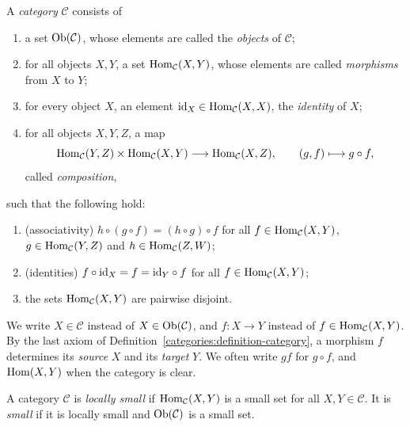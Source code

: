 \begin{definition}\label{categories:definition-category}
A \emph{category} $\mathcal{C}$ consists of
\begin{enumerate}
\item a set $\operatorname{Ob}(\mathcal{C})$, whose elements are called the \emph{objects} of
$\mathcal{C}$;
\item for all objects $X, Y$, a set $\operatorname{Hom}_{\mathcal{C}}(X, Y)$, whose elements
are called \emph{morphisms} from $X$ to $Y$;
\item for every object $X$, an element $\mathrm{id}_X \in \operatorname{Hom}_{\mathcal{C}}(X, X)$,
the \emph{identity} of $X$;
\item for all objects $X, Y, Z$, a map
\[
\operatorname{Hom}_{\mathcal{C}}(Y, Z) \times \operatorname{Hom}_{\mathcal{C}}(X, Y) \longrightarrow
\operatorname{Hom}_{\mathcal{C}}(X, Z), \qquad (g, f) \longmapsto g \circ f,
\]
called \emph{composition},
\end{enumerate}
such that the following hold:
\begin{enumerate}
\item (associativity) $h \circ (g \circ f) = (h \circ g) \circ f$ for all
$f \in \operatorname{Hom}_{\mathcal{C}}(X, Y)$, $g \in \operatorname{Hom}_{\mathcal{C}}(Y, Z)$ and
$h \in \operatorname{Hom}_{\mathcal{C}}(Z, W)$;
\item (identities) $f \circ \mathrm{id}_X = f = \mathrm{id}_Y \circ f$ for all
$f \in \operatorname{Hom}_{\mathcal{C}}(X, Y)$;
\item the sets $\operatorname{Hom}_{\mathcal{C}}(X, Y)$ are pairwise disjoint.
\end{enumerate}
\end{definition}

\begin{notation}\label{categories:notation-morphisms}
We write $X \in \mathcal{C}$ instead of $X \in \operatorname{Ob}(\mathcal{C})$, and
$f \colon X \to Y$ instead of $f \in \operatorname{Hom}_{\mathcal{C}}(X, Y)$. By the last
axiom of Definition~\ref{categories:definition-category}, a morphism $f$
determines its \emph{source} $X$ and its \emph{target} $Y$. We often write
$gf$ for $g \circ f$, and $\operatorname{Hom}(X, Y)$ when the category is clear.
\end{notation}

\begin{definition}\label{categories:definition-small}
A category $\mathcal{C}$ is \emph{locally small} if $\operatorname{Hom}_{\mathcal{C}}(X, Y)$
is a small set for all $X, Y \in \mathcal{C}$. It is \emph{small} if it is
locally small and $\operatorname{Ob}(\mathcal{C})$ is a small set.
\end{definition}

